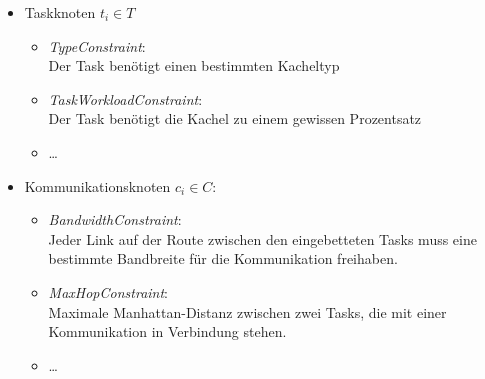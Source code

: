 \begin{itemize}
\item Taskknoten $t_i\in T$
\begin{itemize}
\item \textit{TypeConstraint}: \\
Der Task benötigt einen bestimmten Kacheltyp
\item \textit{TaskWorkloadConstraint}: \\
Der Task benötigt die Kachel zu einem gewissen Prozentsatz
\item \dots 
\label{Taskknoten}
\end{itemize}
\item Kommunikationsknoten $c_i \in C$:
\begin{itemize}
\item \textit{BandwidthConstraint}: \\
Jeder Link auf der Route zwischen den eingebetteten Tasks muss eine bestimmte Bandbreite für die Kommunikation freihaben.
\item \textit{MaxHopConstraint}: \\
Maximale Manhattan-Distanz zwischen zwei Tasks, die mit einer Kommunikation in Verbindung stehen. 
\item \dots
\label{Kommunikationsknoten}
\end{itemize}
\end{itemize}

